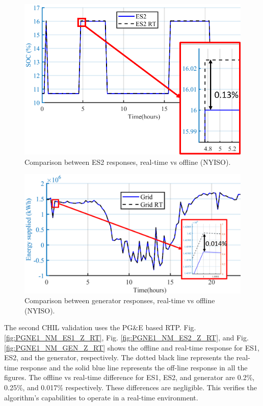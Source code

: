 \begin{figure}[!ht]
\centering
\includegraphics[width = \linewidth]{figs/A82/OFFLINE1_NM_ES2_Z_RT.png}
\caption{Comparison between ES2 responses, real-time vs offline (NYISO).}
\label{fig:OFFLINE1_NM_ES2_Z_RT}
\end{figure}

\begin{figure}[!ht]
\centering
\includegraphics[width = \linewidth]{figs/A82/OFFLINE1_NM_GEN_Z_RT.png}
\caption{Comparison between generator responses, real-time vs offline (NYISO).}
\label{fig:OFFLINE1_NM_GEN_Z_RT}
\end{figure}

The second CHIL validation uses the PG\&E based RTP. Fig. \ref{fig:PGNE1_NM_ES1_Z_RT}, Fig. \ref{fig:PGNE1_NM_ES2_Z_RT}, and Fig. \ref{fig:PGNE1_NM_GEN_Z_RT} shows the offline and real-time response for ES1, ES2, and the generator, respectively. The dotted black line represents the real-time response and the solid blue line represents the off-line response in all the figures. The offline vs real-time difference for ES1, ES2, and generator are 0.2\%, 0.25\%, and 0.017\% respectively. These differences are negligible. This verifies the algorithm's capabilities to operate in a real-time environment.

